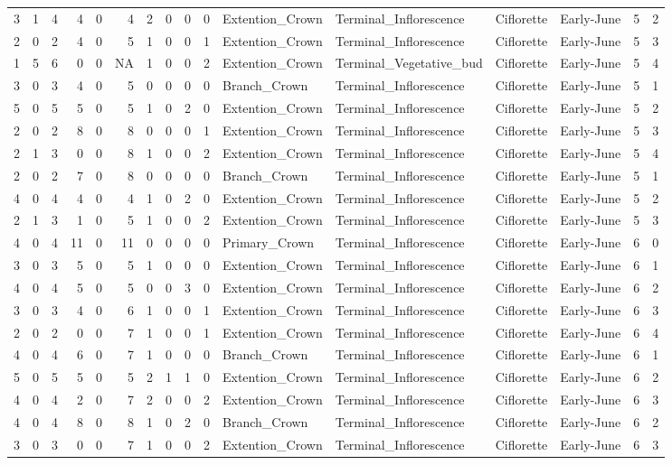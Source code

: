 \documentclass[]{article}
\begin{document}
\begin{longtable}[]{@{}rrrrrrrrrrllllrl@{}}
3 & 1 & 4 & 4 & 0 & 4 & 2 & 0 & 0 & 0 & Extention\_Crown &
Terminal\_Inflorescence & Ciflorette & Early-June & 5 & 2\tabularnewline
2 & 0 & 2 & 4 & 0 & 5 & 1 & 0 & 0 & 1 & Extention\_Crown &
Terminal\_Inflorescence & Ciflorette & Early-June & 5 & 3\tabularnewline
1 & 5 & 6 & 0 & 0 & NA & 1 & 0 & 0 & 2 & Extention\_Crown &
Terminal\_Vegetative\_bud & Ciflorette & Early-June & 5 &
4\tabularnewline
3 & 0 & 3 & 4 & 0 & 5 & 0 & 0 & 0 & 0 & Branch\_Crown &
Terminal\_Inflorescence & Ciflorette & Early-June & 5 & 1\tabularnewline
5 & 0 & 5 & 5 & 0 & 5 & 1 & 0 & 2 & 0 & Extention\_Crown &
Terminal\_Inflorescence & Ciflorette & Early-June & 5 & 2\tabularnewline
2 & 0 & 2 & 8 & 0 & 8 & 0 & 0 & 0 & 1 & Extention\_Crown &
Terminal\_Inflorescence & Ciflorette & Early-June & 5 & 3\tabularnewline
2 & 1 & 3 & 0 & 0 & 8 & 1 & 0 & 0 & 2 & Extention\_Crown &
Terminal\_Inflorescence & Ciflorette & Early-June & 5 & 4\tabularnewline
2 & 0 & 2 & 7 & 0 & 8 & 0 & 0 & 0 & 0 & Branch\_Crown &
Terminal\_Inflorescence & Ciflorette & Early-June & 5 & 1\tabularnewline
4 & 0 & 4 & 4 & 0 & 4 & 1 & 0 & 2 & 0 & Extention\_Crown &
Terminal\_Inflorescence & Ciflorette & Early-June & 5 & 2\tabularnewline
2 & 1 & 3 & 1 & 0 & 5 & 1 & 0 & 0 & 2 & Extention\_Crown &
Terminal\_Inflorescence & Ciflorette & Early-June & 5 & 3\tabularnewline
4 & 0 & 4 & 11 & 0 & 11 & 0 & 0 & 0 & 0 & Primary\_Crown &
Terminal\_Inflorescence & Ciflorette & Early-June & 6 & 0\tabularnewline
3 & 0 & 3 & 5 & 0 & 5 & 1 & 0 & 0 & 0 & Extention\_Crown &
Terminal\_Inflorescence & Ciflorette & Early-June & 6 & 1\tabularnewline
4 & 0 & 4 & 5 & 0 & 5 & 0 & 0 & 3 & 0 & Extention\_Crown &
Terminal\_Inflorescence & Ciflorette & Early-June & 6 & 2\tabularnewline
3 & 0 & 3 & 4 & 0 & 6 & 1 & 0 & 0 & 1 & Extention\_Crown &
Terminal\_Inflorescence & Ciflorette & Early-June & 6 & 3\tabularnewline
2 & 0 & 2 & 0 & 0 & 7 & 1 & 0 & 0 & 1 & Extention\_Crown &
Terminal\_Inflorescence & Ciflorette & Early-June & 6 & 4\tabularnewline
4 & 0 & 4 & 6 & 0 & 7 & 1 & 0 & 0 & 0 & Branch\_Crown &
Terminal\_Inflorescence & Ciflorette & Early-June & 6 & 1\tabularnewline
5 & 0 & 5 & 5 & 0 & 5 & 2 & 1 & 1 & 0 & Extention\_Crown &
Terminal\_Inflorescence & Ciflorette & Early-June & 6 & 2\tabularnewline
4 & 0 & 4 & 2 & 0 & 7 & 2 & 0 & 0 & 2 & Extention\_Crown &
Terminal\_Inflorescence & Ciflorette & Early-June & 6 & 3\tabularnewline
4 & 0 & 4 & 8 & 0 & 8 & 1 & 0 & 2 & 0 & Branch\_Crown &
Terminal\_Inflorescence & Ciflorette & Early-June & 6 & 2\tabularnewline
3 & 0 & 3 & 0 & 0 & 7 & 1 & 0 & 0 & 2 & Extention\_Crown &
Terminal\_Inflorescence & Ciflorette & Early-June & 6 & 3\tabularnewline

\end{longtable}
\end{document}
